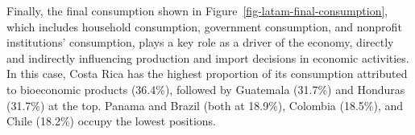 \documentclass[
  letterpaper,
  DIV=11,
  numbers=noendperiod]{scrartcl}
\begin{document}
Finally, the final consumption shown in
Figure~\ref{fig-latam-final-consumption}, which includes household
consumption, government consumption, and nonprofit institutions'
consumption, plays a key role as a driver of the economy, directly and
indirectly influencing production and import decisions in economic
activities. In this case, Costa Rica has the highest proportion of its
consumption attributed to bioeconomic products (36.4\%), followed by
Guatemala (31.7\%) and Honduras (31.7\%) at the top. Panama and Brazil
(both at 18.9\%), Colombia (18.5\%), and Chile (18.2\%) occupy the
lowest positions.

\begin{figure}

\begin{minipage}{\linewidth}



\end{minipage}%
\newline
\begin{minipage}{\linewidth}

\end{minipage}
\end{figure}
\end{document}
